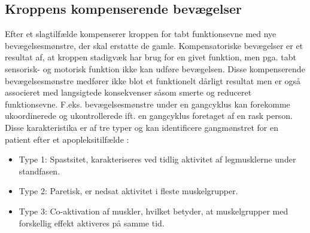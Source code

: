 \subsection{Kroppens kompenserende bevægelser}
Efter et slagtilfælde kompenserer kroppen for tabt funktionsevne med nye bevægelsesmønstre, der skal erstatte de gamle. Kompensatoriske bevægelser er et resultat af, at kroppen stadigvæk har brug for en givet funktion, men pga. tabt sensorisk- og motorisk funktion ikke kan udføre bevægelsen. Disse kompenserende bevægelsesmønstre medfører ikke blot et funktionelt dårligt resultat men er også associeret med langsigtede konsekvenser såsom smerte og reduceret funktionsevne. \cite{Takeuchi2012,Leea2009} F.eks. bevægelsesmønstre under en gangcyklus kan forekomme ukoordinerede og ukontrollerede ift. en gangcyklus foretaget af en rask person. Disse karakteristika er af tre typer og kan identificere gangmønstret for en patient efter et apopleksitilfælde  \cite{Lamontagne2006}:
\begin{itemize}
\item Type 1: Spastsitet, karakteriseres ved tidlig aktivitet af legmusklerne under standfasen.
\item Type 2: Paretisk, er nedsat aktivitet i fleste muskelgrupper.
\item Type 3: Co-aktivation af muskler, hvilket betyder, at muskelgrupper med forskellig effekt aktiveres på samme tid.
\end{itemize}